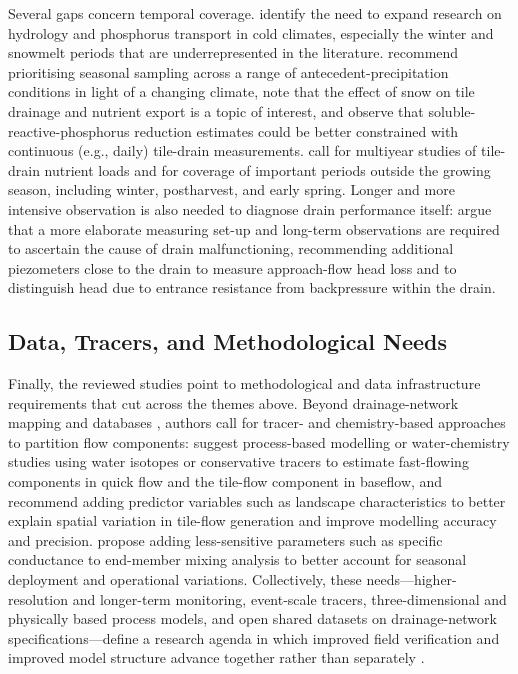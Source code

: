 \documentclass[11pt]{article}
\begin{document}
Several gaps concern temporal coverage. \textcite{King2015} identify the need to expand research on hydrology and phosphorus transport in cold climates, especially the winter and snowmelt periods that are underrepresented in the literature. \textcite{Trentman2020} recommend prioritising seasonal sampling across a range of antecedent-precipitation conditions in light of a changing climate, note that the effect of snow on tile drainage and nutrient export is a topic of interest, and observe that soluble-reactive-phosphorus reduction estimates could be better constrained with continuous (e.g., daily) tile-drain measurements. \textcite{Millar2025} call for multiyear studies of tile-drain nutrient loads and for coverage of important periods outside the growing season, including winter, postharvest, and early spring. Longer and more intensive observation is also needed to diagnose drain performance itself: \textcite{Rimidis2003} argue that a more elaborate measuring set-up and long-term observations are required to ascertain the cause of drain malfunctioning, recommending additional piezometers close to the drain to measure approach-flow head loss and to distinguish head due to entrance resistance from backpressure within the drain.

\subsection{Data, Tracers, and Methodological Needs}

Finally, the reviewed studies point to methodological and data infrastructure requirements that cut across the themes above. Beyond drainage-network mapping and databases \parencite{Zhou2025,Valayamkunnath2020,Naz2009}, authors call for tracer- and chemistry-based approaches to partition flow components: \textcite{Frederiksen2023} suggest process-based modelling or water-chemistry studies using water isotopes or conservative tracers to estimate fast-flowing components in quick flow and the tile-flow component in baseflow, and recommend adding predictor variables such as landscape characteristics to better explain spatial variation in tile-flow generation and improve modelling accuracy and precision. \textcite{Schilling2019} propose adding less-sensitive parameters such as specific conductance to end-member mixing analysis to better account for seasonal deployment and operational variations. Collectively, these needs---higher-resolution and longer-term monitoring, event-scale tracers, three-dimensional and physically based process models, and open shared datasets on drainage-network specifications---define a research agenda in which improved field verification and improved model structure advance together rather than separately \parencite{Schilling2008,Bauwe2016,Zhou2025}.

\printbibliography
\end{document}
